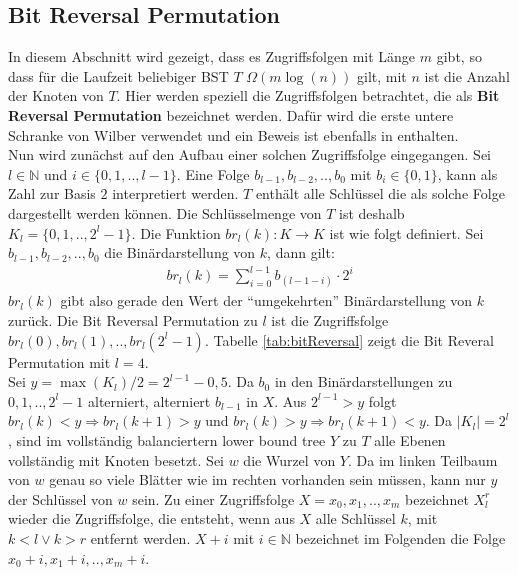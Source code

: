 \documentclass[a4paper,12pt]{article}
\begin{document}
\subsection{Bit Reversal Permutation } \label{abschnittBitReversal}
In diesem Abschnitt wird gezeigt, dass es Zugriffsfolgen mit Länge $m$ gibt, so dass für die Laufzeit beliebiger BST $T$ $\Omega\left(m \log\left( n\right)\right)$ gilt, mit $n$ ist die Anzahl der Knoten von $T$. Hier werden speziell die Zugriffsfolgen betrachtet, die als \textbf{Bit Reversal Permutation} bezeichnet werden. 
Dafür wird die erste untere Schranke von Wilber verwendet und ein Beweis ist ebenfalls in \cite{wilberLowerBounds} enthalten. \\
Nun wird zunächst auf den Aufbau einer solchen Zugriffsfolge eingegangen. Sei $l \in \mathbb{N}$ und $i \in \{0,1,..,l-1\}$. Eine Folge  $b_{l-1},b_{l-2},..,b_0$ mit $b_i \in \{0,1\}$, kann als Zahl zur Basis $2$ interpretiert werden. $T$ enthält alle Schlüssel die als solche Folge dargestellt werden können. Die Schlüsselmenge von $T$ ist deshalb $K_l = \{0,1,..,2^l -1\}$. 
Die Funktion $\mathit{br}_l(k)\colon K \rightarrow K$ ist wie folgt definiert. Sei {$b_{l-1},b_{l-2},..,b_{0}$} die Binärdarstellung von $k$, dann gilt:
\begin{align*}
\mathit{br}_l(k) = \sum_{i = 0}^{l-1} b_{\left(l-1-i\right)} \cdot 2^i
\end{align*}
$\mathit{br}_l(k)$ gibt also gerade den Wert der \enquote{umgekehrten} Binärdarstellung von $k$ zurück. Die Bit Reversal Permutation zu $l$ ist die Zugriffsfolge\\ ${\mathit{br}_l(0),\mathit{br}_l(1),..,\mathit{br}_l(2^l-1)}$. Tabelle \ref{tab:bitReversal} zeigt die Bit Reveral Permutation mit $l  = 4$.\\
 Sei $y = \max\left(K_l\right) /2 = 2^{l-1} - 0,5 $. Da $b_0$ in den Binärdarstellungen zu $0, 1,.., 2^l-1$ alterniert, alterniert $b_{l-1}$ in $X$. Aus $2^{l-1} > y$ folgt \\ $\mathit{br}_l(k) < y \Rightarrow \mathit{br}_l(k +1) > y$ und $\mathit{br}_l(k) > y \Rightarrow \mathit{br}_l(k +1) < y$. Da $\vert K_l \vert = 2^l$, sind im vollständig balanciertern lower bound tree $Y$ zu $T$ alle Ebenen vollständig mit Knoten besetzt. Sei $w$ die Wurzel von $Y$. Da im linken Teilbaum von $w$ genau so viele Blätter wie im rechten vorhanden sein müssen, kann nur $y$ der Schlüssel von $w$ sein. Zu einer Zugriffsfolge $X = x_0,x_1,..,x_m$ bezeichnet $X^r_l$ wieder die Zugriffsfolge, die entsteht, wenn aus $X$ alle Schlüssel $k$, mit $k < l \lor k > r$ entfernt werden. $X + i$ mit $i \in \mathbb{N}$ bezeichnet im Folgenden die Folge $x_0 + i, x_1 + i,.., x_m + i$.\\
\end{document}
